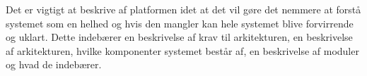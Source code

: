 Det er vigtigt at beskrive af platformen idet at det vil gøre det nemmere at forstå systemet som en helhed og hvis den mangler kan hele systemet blive forvirrende og uklart.
Dette indebærer en beskrivelse af krav til arkitekturen, en beskrivelse af arkitekturen, hvilke komponenter systemet består af, en beskrivelse af moduler og hvad de indebærer.
